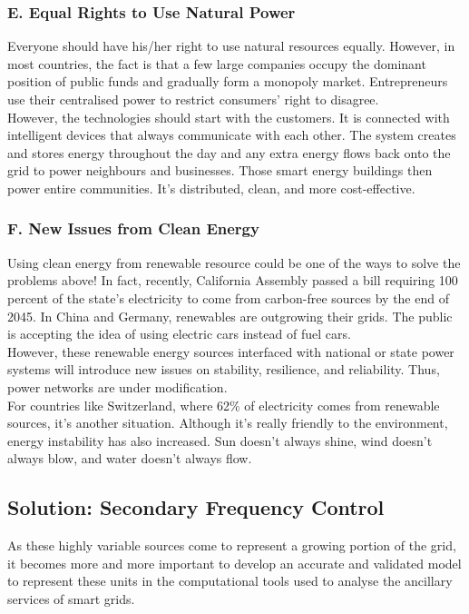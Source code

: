\documentclass{report}
\begin{document}
\subsubsection{E. Equal Rights to Use Natural Power}
Everyone should have his/her right to use natural resources equally. However, in most countries, the fact is that a few large companies occupy the dominant position of public funds and gradually form a monopoly market. Entrepreneurs use their centralised power to restrict consumers’ right to disagree.\\

However, the technologies should start with the customers. It is connected with intelligent devices that always communicate with each other. The system creates and stores energy throughout the day and any extra energy flows back onto the grid to power neighbours and businesses. Those smart energy buildings then power entire communities. It’s distributed, clean, and more cost-effective.\\

\subsubsection{F. New Issues from Clean Energy}
Using clean energy from renewable resource could be one of the ways to solve the problems above! In fact, recently, California Assembly passed a bill requiring 100 percent of the state’s electricity to come from carbon-free sources by the end of 2045. In China and Germany, renewables are outgrowing their grids. The public is accepting the idea of using electric cars instead of fuel cars.\\

However, these renewable energy sources interfaced with national or state power systems will introduce new issues on stability, resilience, and reliability. Thus, power networks are under modification.\\

For countries like Switzerland, where 62\% of electricity comes from renewable sources, it’s another situation. Although it’s really friendly to the environment, energy instability has also increased. Sun doesn’t always shine, wind doesn’t always blow, and water doesn’t always flow.\\

\subsection{Solution: Secondary Frequency Control}
As these highly variable sources come to represent a growing portion of the grid, it becomes more and more important to develop an accurate and validated model to represent these units in the computational tools used to analyse the ancillary services of smart grids.\\
\end{document}

